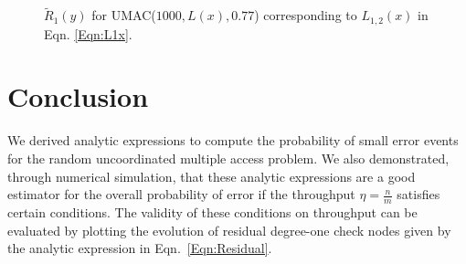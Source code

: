 \begin{figure}[!ht]
\centering
\resizebox{0.9\textwidth}{!}{}
\caption{$\tilde{R}_{1}(y)$ for UMAC($1000,L(x),0.77$) corresponding to $L_{1,2}(x)$ in Eqn. \eqref{Eqn:L1x}.}
\label{Fig:UMAC_Residual}
\end{figure}


\section{Conclusion}
We derived analytic expressions to compute the probability of small error events for the random uncoordinated multiple access problem. We also demonstrated, through numerical simulation, that these analytic expressions are a good estimator for the overall probability of error if the throughput $\eta=\frac{n}{m}$ satisfies certain conditions. The validity of these conditions on throughput can be evaluated by plotting the evolution of residual degree-one check nodes given by the analytic expression in Eqn.~\eqref{Eqn:Residual}.
